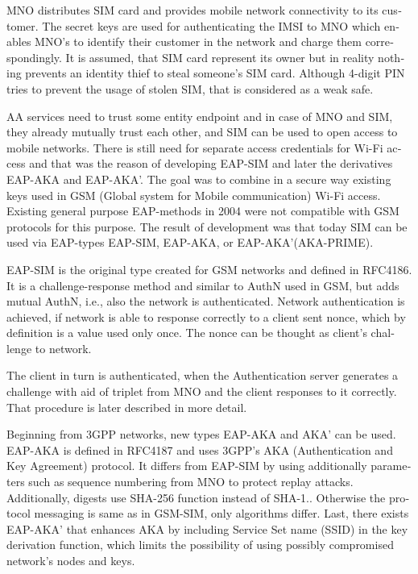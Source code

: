 \documentclass[12pt,a4paper,english]{tutthesis}
\begin{document}
\begin{otherlanguage}{english}
MNO distributes SIM card and provides mobile network connectivity to
its customer.  The secret keys are used for authenticating the IMSI
to MNO which enables MNO's to identify their customer in the network
and charge them correspondingly. It is assumed, that SIM card represent
its owner but in reality nothing prevents an identity thief to steal
someone's SIM card. Although 4-digit PIN tries to prevent the usage of 
stolen SIM, that is considered as a weak safe\cite[p.31]{aaa-nakhjiri2005}.


AA services need to trust some entity endpoint and in case of MNO and
SIM, they already mutually trust each other, and SIM can be used 
to open access to mobile networks.
There is still need for separate access credentials for Wi-Fi access
and that was the reason of developing EAP-SIM and later the
derivatives EAP-AKA and EAP-AKA'.  The goal was to combine in a secure
way existing keys used in  GSM (Global system for Mobile communication)
Wi-Fi access. Existing general purpose EAP-methods in 2004 were not
compatible with GSM protocols for this purpose. \cite[p.93]{hav-doc}
The result of development was that today SIM can be used via EAP-types EAP-SIM, EAP-AKA, or
EAP-AKA'(AKA-PRIME).

EAP-SIM is the original type created for GSM networks and defined 
in RFC4186\cite{rfc4186}.
It is a challenge-response method and similar to AuthN used in GSM, 
but adds mutual AuthN, i.e., also the network is authenticated.
Network authentication is achieved, if 
network is able to response correctly to a client sent nonce,
which by definition is a value used only once. The nonce can
be thought as  client's challenge to network.

The client in  turn is authenticated, when the Authentication server
generates a challenge with aid of triplet from MNO and the client
responses to it correctly.
That procedure is later described in more detail.

Beginning from 3GPP networks, new types EAP-AKA and AKA' can be used.
EAP-AKA is defined in RFC4187\cite{rfc4187} and 
uses 3GPP's AKA (Authentication and Key Agreement) protocol.
It differs from EAP-SIM by using additionally parameters such as
sequence numbering from MNO to protect replay attacks. 
Additionally, digests use SHA-256 function instead of SHA-1.\cite{rfc5448}.
Otherwise the protocol messaging is same as in  GSM-SIM, only algorithms differ.
Last, there exists EAP-AKA' that enhances AKA by including Service Set name (SSID) 
in the key derivation function, which limits the possibility of using possibly
compromised network's nodes and keys. 



\end{otherlanguage}
\end{document}
